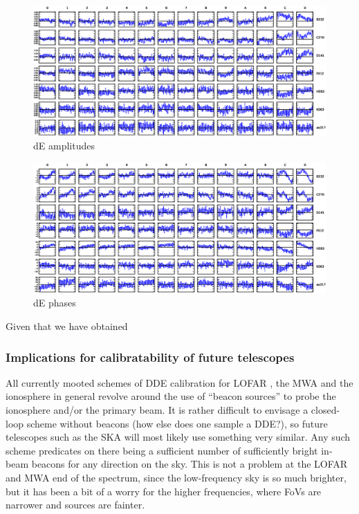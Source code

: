 \documentclass[]{aa}
\begin{document}
\begin{figure}
\begin{centering}
\includegraphics[width=2\columnwidth]{dE_mean}
\end{centering}
\caption{\label{fig:dEampl}dE amplitudes}
\end{figure}

\begin{figure}
\begin{centering}
\includegraphics[width=2\columnwidth]{dEphase_mean}
\end{centering}
\caption{\label{fig:dEphase}dE phases}
\end{figure}

Given that we have obtained

\subsubsection{Implications for calibratability of future telescopes}

All currently mooted schemes of DDE calibration for LOFAR \citep{JEN:LOFAR3}, the MWA \citep{Mitchell:MWA-cal} and the ionosphere in general \citep{Intema:SPAM,Cotton:FBC} revolve around the use of ``beacon sources'' to probe the ionosphere and/or the primary beam. It is rather difficult to envisage a closed-loop scheme without beacons (how else does one sample a DDE?), so future telescopes such as the SKA will most likely use something very similar. Any such scheme predicates on there being a sufficient number of sufficiently bright in-beam beacons for any direction on the sky. This is not a problem at the LOFAR and MWA end of the spectrum, since the low-frequency sky is so much brighter, but it has been a bit of a worry for the higher frequencies, where FoVs are narrower and sources are fainter.
\end{document}
